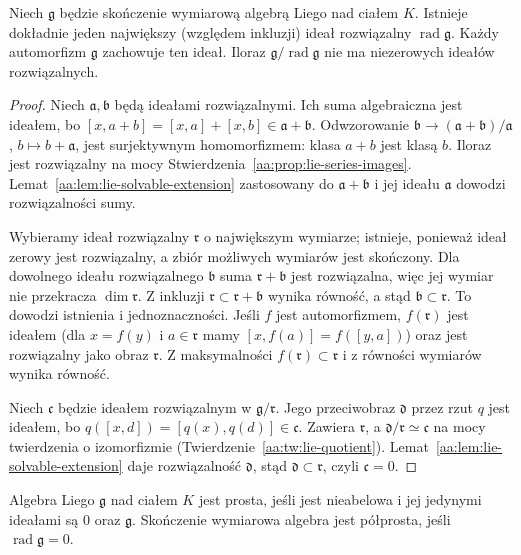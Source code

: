 \begin{twierdzenie}
\label{aa:tw:lie-radical}
Niech $\mathfrak g$ będzie skończenie wymiarową algebrą
Liego nad ciałem $K$. Istnieje dokładnie jeden
największy (względem inkluzji) ideał rozwiązalny
$\operatorname{rad}\mathfrak g$.
Każdy automorfizm $\mathfrak g$ zachowuje ten ideał.
Iloraz $\mathfrak g/\operatorname{rad}\mathfrak g$
nie ma niezerowych ideałów rozwiązalnych.
\end{twierdzenie}
\begin{proof}
Niech $\mathfrak a,\mathfrak b$ będą ideałami
rozwiązalnymi. Ich suma algebraiczna jest ideałem,
bo $[x,a+b]=[x,a]+[x,b]\in\mathfrak a+\mathfrak b$.
Odwzorowanie
$\mathfrak b\to(\mathfrak a+\mathfrak b)/\mathfrak a$,
$b\mapsto b+\mathfrak a$, jest surjektywnym
homomorfizmem: klasa $a+b$ jest klasą $b$.
Iloraz jest rozwiązalny na mocy
Stwierdzenia~\ref{aa:prop:lie-series-images}.
Lemat~\ref{aa:lem:lie-solvable-extension} zastosowany
do $\mathfrak a+\mathfrak b$ i jej ideału
$\mathfrak a$ dowodzi rozwiązalności sumy.

Wybieramy ideał rozwiązalny $\mathfrak r$ o największym
wymiarze; istnieje, ponieważ ideał zerowy jest
rozwiązalny, a zbiór możliwych wymiarów jest skończony.
Dla dowolnego ideału rozwiązalnego $\mathfrak b$
suma $\mathfrak r+\mathfrak b$ jest rozwiązalna,
więc jej wymiar nie przekracza $\dim\mathfrak r$.
Z inkluzji $\mathfrak r\subset\mathfrak r+\mathfrak b$
wynika równość, a stąd $\mathfrak b\subset\mathfrak r$.
To dowodzi istnienia i jednoznaczności.
Jeśli $f$ jest automorfizmem, $f(\mathfrak r)$
jest ideałem (dla $x=f(y)$ i $a\in\mathfrak r$
mamy $[x,f(a)]=f([y,a])$) oraz jest rozwiązalny
jako obraz $\mathfrak r$. Z maksymalności
$f(\mathfrak r)\subset\mathfrak r$ i z równości
wymiarów wynika równość.

Niech $\mathfrak c$ będzie ideałem rozwiązalnym
w $\mathfrak g/\mathfrak r$. Jego przeciwobraz
$\mathfrak d$ przez rzut $q$ jest ideałem, bo
$q([x,d])=[q(x),q(d)]\in\mathfrak c$. Zawiera
$\mathfrak r$, a $\mathfrak d/\mathfrak r\simeq
\mathfrak c$ na mocy twierdzenia o izomorfizmie
(Twierdzenie~\ref{aa:tw:lie-quotient}).
Lemat~\ref{aa:lem:lie-solvable-extension} daje rozwiązalność
$\mathfrak d$, stąd $\mathfrak d\subset\mathfrak r$,
czyli $\mathfrak c=0$.
\end{proof}

\begin{definicja}
\label{aa:def:semisimple-lie}
Algebra Liego $\mathfrak g$ nad ciałem $K$ jest prosta,
jeśli jest nieabelowa i jej jedynymi ideałami są
$0$ oraz $\mathfrak g$. Skończenie wymiarowa algebra
jest półprosta, jeśli $\operatorname{rad}\mathfrak g=0$.
\end{definicja}

